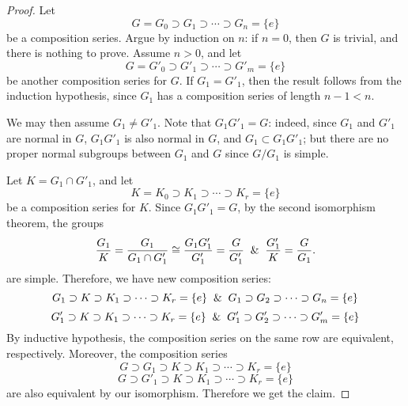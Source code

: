 \begin{proof}
Let
\[G=G_0\supset G_1\supset\cdots\supset G_n=\{e\}\]
be a composition series. Argue by induction on $n$: if $n=0$, then $G$ is trivial, and there is nothing to prove. Assume $n>0$, and let
\[G=G'_0\supset G'_1\supset\cdots\supset G'_m=\{e\}\]
be another composition series for $G$. If $G_1=G'_1$, then the result follows from the induction hypothesis, since $G_1$ has a composition series of length $n-1<n$.\par
We may then assume $G_1\neq G'_1$. Note that $G_1G'_1=G$: indeed, since $G_1$ and $G'_1$ are normal in $G$, $G_1G'_1$ is also normal in $G$, and $G_1\subset G_1G'_1$; but there are no proper normal subgroups between $G_1$ and $G$ since $G/G_1$ is simple.\par
Let $K=G_1\cap G'_1$, and let
\[K=K_0\supset K_1\supset\cdots\supset K_r=\{e\}\]
be a composition series for $K$. Since $G_1G'_1=G$, by the second isomorphism theorem, the groups
\[\frac{G_1}{K}=\frac{G_1}{G_1\cap G'_1}\cong\frac{G_1G'_1}{G'_1}=\frac{G}{G'_1}\And \frac{G'_1}{K}=\frac{G}{G_1}.\]
are simple. Therefore, we have new composition series:
\[
G_1\supset K\supset K_1\supset\cdots\supset K_r=\{e\}\And G_1\supset G_2\supset \cdots\supset G_n=\{e\}\]
\[
G'_1\supset K\supset K_1\supset\cdots\supset K_r=\{e\}\And G'_1\supset G'_2\supset \cdots\supset G'_m=\{e\}
\]
By inductive hypothesis, the composition series on the same row are equivalent, respectively. Moreover, the composition series
\[
G\supset G_1\supset K\supset K_1\supset\cdots\supset K_r=\{e\}\]
\[
G\supset G'_1\supset K\supset K_1\supset\cdots\supset K_r=\{e\}
\]
are also equivalent by our isomorphism. Therefore we get the claim.
\end{proof}
